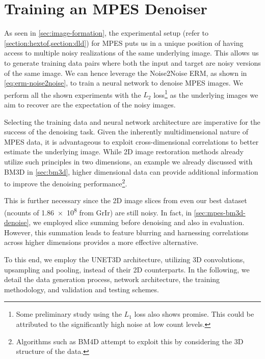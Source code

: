 \section{Training an MPES Denoiser}
As seen in \cref{sec:image-formation}, the experimental setup (refer to \cref{section:hextof,section:dld}) for \gls{MPES} puts us in a unique position of having access to multiple noisy realizations of the same underlying image. This allows us to generate training data pairs where both the input and target are noisy versions of the same image. We can hence leverage the Noise2Noise \gls{ERM}, as shown in \cref{eq:erm-noise2noise}, to train a neural network to denoise \gls{MPES} images. We perform all the shown experiments with the $L_2$ loss\footnote{Some preliminary study using the $L_1$ loss also shows promise. This could be attributed to the significantly high noise at low count levels.} as the underlying images we aim to recover are the expectation of the noisy images.

Selecting the training data and neural network architecture are imperative for the success of the denoising task. Given the inherently multidimensional nature of \gls{MPES} data, it is advantageous to exploit cross-dimensional correlations to better estimate the underlying image. While 2D image restoration methods already utilize such principles in two dimensions, an example we already discussed with \gls{BM3D} in \cref{sec:bm3d}, higher dimensional data can provide additional information to improve the denoising performance\footnote{Algorithms such as BM4D \cite{maggionimNonlocalTransformdomainFilter} attempt to exploit this by considering the 3D structure of the data.}. 

This is further necessary since the 2D image slices from even our best dataset (\gls{ncounts} of \num{1.86e8} from \gls{GrIr}) are still noisy. In fact, in \cref{sec:mpes-bm3d-denoise}, we employed slice summing before denoising and also in evaluation. However, this summation leads to feature blurring and harnessing correlations across higher dimensions provides a more effective alternative.

To this end, we employ the UNET3D architecture, utilizing 3D convolutions, upsampling and pooling, instead of their 2D counterparts. In the following, we detail the data generation process, network architecture, the training methodology, and validation and testing schemes.


